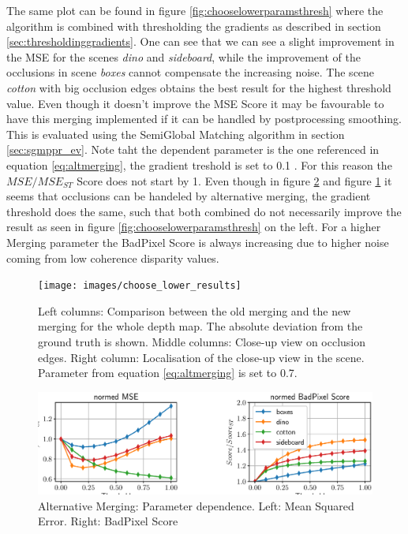 \documentclass  [
  paper    = a4,
  BCOR     = 10mm,
  twoside,
  fontsize = 12pt,
  fleqn,
  toc      = bibnumbered,
  toc      = listofnumbered,
  numbers  = noendperiod,
  headings = normal,
  listof   = leveldown,
  version  = 3.03
]                                       {scrreprt}
\begin{document}
The same plot can be found in figure \ref{fig:chooselowerparamsthresh} where the algorithm is combined with thresholding the gradients as described in section \ref{sec:thresholdinggradients}. One can see that we can see a slight improvement in the MSE for the scenes \textit{dino} and \textit{sideboard}, while the improvement of the occlusions in scene \textit{boxes} cannot compensate the increasing noise. The scene \textit{cotton} with big occlusion edges obtains the best result for the highest threshold value. Even though it doesn't improve the MSE Score it may be favourable to have this merging implemented if it can be handled by postprocessing smoothing. This is evaluated using the SemiGlobal Matching algorithm in section \ref{sec:sgmppr_ev}. Note taht the dependent parameter is the one referenced in equation \ref{eq:altmerging}, the gradient treshold is set to 0.1 . For this reason the $MSE/MSE_{ST}$ Score does not start by 1. Even though in figure \ref{fig:chooselowerparams} and figure \ref{fig:chooselowerresults} it seems that occlusions can be handeled by alternative merging, the gradient threshold does the same, such that both combined do not necessarily improve the result as seen in figure \ref{fig:chooselowerparamsthresh} on the left. For a higher Merging parameter the BadPixel Score is always increasing due to higher noise coming from low coherence disparity values.


\begin{figure}
	\centering
	\texttt{[image: images/choose\_lower\_results]}
	\caption[Results from alternative merging of x- and y- direction]{Left columns: Comparison between the old merging and the new merging for the whole depth map. The absolute deviation from the ground truth is shown. Middle columns: Close-up view on occlusion edges. Right column: Localisation of the close-up view in the scene. Parameter from equation \ref{eq:altmerging} is set to 0.7.}
	\label{fig:chooselowerresults}
\end{figure}

\begin{figure}
	\centering
	\includegraphics[width=1\linewidth]{images/choose_lower_params}
	\caption[Alternative Merging: Parameter dependence]{Alternative Merging: Parameter dependence. Left: Mean Squared Error. Right: BadPixel Score}
	\label{fig:chooselowerparams}
\end{figure}
\end{document}
